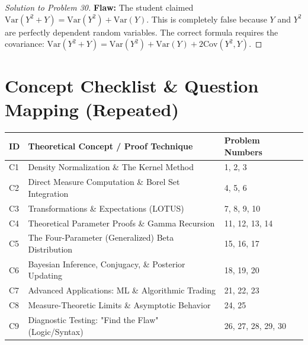 \documentclass[11pt, a4paper]{article}
\theoremstyle{definition}
\theoremstyle{remark}
\begin{document}
\begin{proof}[Solution to Problem 30]
\textbf{Flaw:} The student claimed $\text{Var}(Y^2 + Y) = \text{Var}(Y^2) + \text{Var}(Y)$. This is completely false because $Y$ and $Y^2$ are perfectly dependent random variables. The correct formula requires the covariance: $\text{Var}(Y^2 + Y) = \text{Var}(Y^2) + \text{Var}(Y) + 2\text{Cov}(Y^2, Y)$.
\end{proof}

\newpage
\section{Concept Checklist \& Question Mapping (Repeated)}

\renewcommand{\arraystretch}{1.5}
\noindent
\begin{tabularx}{\textwidth}{l X l}
\toprule
\textbf{ID} & \textbf{Theoretical Concept / Proof Technique} & \textbf{Problem Numbers} \\
\midrule
C1 & Density Normalization \& The Kernel Method & 1, 2, 3 \\
C2 & Direct Measure Computation \& Borel Set Integration & 4, 5, 6 \\
C3 & Transformations \& Expectations (LOTUS) & 7, 8, 9, 10 \\
C4 & Theoretical Parameter Proofs \& Gamma Recursion & 11, 12, 13, 14 \\
C5 & The Four-Parameter (Generalized) Beta Distribution & 15, 16, 17 \\
C6 & Bayesian Inference, Conjugacy, \& Posterior Updating & 18, 19, 20 \\
C7 & Advanced Applications: ML \& Algorithmic Trading & 21, 22, 23 \\
C8 & Measure-Theoretic Limits \& Asymptotic Behavior & 24, 25 \\
C9 & Diagnostic Testing: "Find the Flaw" (Logic/Syntax) & 26, 27, 28, 29, 30 \\
\bottomrule
\end{tabularx}
\end{document}
